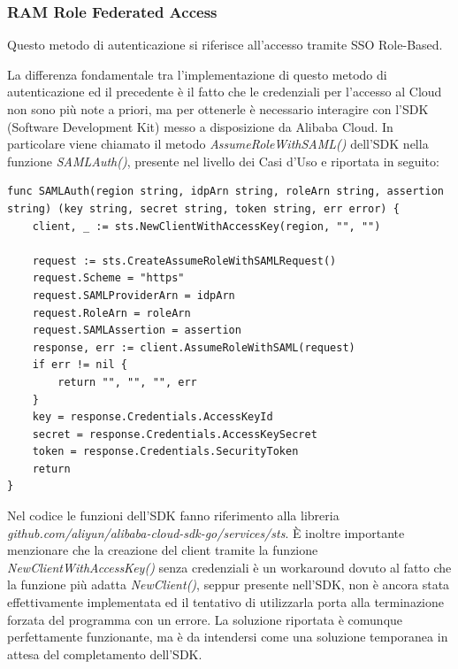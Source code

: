 \documentclass[a4paper]{article}
\begin{document}
\subsubsection{RAM Role Federated Access}
Questo metodo di autenticazione si riferisce all'accesso tramite SSO Role-Based.

La differenza fondamentale tra l'implementazione di questo metodo di autenticazione ed il precedente è il fatto che le credenziali per l'accesso al Cloud non sono più note a priori, ma per ottenerle è necessario interagire con l'SDK (Software Development Kit) messo a disposizione da Alibaba Cloud. In particolare viene chiamato il metodo \textit{AssumeRoleWithSAML()} dell'SDK nella funzione \textit{SAMLAuth()}, presente nel livello dei Casi d'Uso e riportata in seguito:

\begin{lstlisting}[style=customgo, caption=alibaba\_ram\_role\_federated\_session\_actions.go (righe 20-36), captionpos=b, firstnumber=20]
func SAMLAuth(region string, idpArn string, roleArn string, assertion string) (key string, secret string, token string, err error) {
	client, _ := sts.NewClientWithAccessKey(region, "", "")

	request := sts.CreateAssumeRoleWithSAMLRequest()
	request.Scheme = "https"
	request.SAMLProviderArn = idpArn
	request.RoleArn = roleArn
	request.SAMLAssertion = assertion
	response, err := client.AssumeRoleWithSAML(request)
	if err != nil {
		return "", "", "", err
	}
	key = response.Credentials.AccessKeyId
	secret = response.Credentials.AccessKeySecret
	token = response.Credentials.SecurityToken
	return
}
\end{lstlisting}
Nel codice le funzioni dell'SDK fanno riferimento alla libreria \textit{github.com/aliyun/alibaba-cloud-sdk-go/services/sts}. È inoltre importante menzionare che la creazione del client tramite la funzione \textit{NewClientWithAccessKey()} senza credenziali è un workaround dovuto al fatto che la funzione più adatta \textit{NewClient()}, seppur presente nell'SDK, non è ancora stata effettivamente implementata ed il tentativo di utilizzarla porta alla terminazione forzata del programma con un errore. La soluzione riportata è comunque perfettamente funzionante, ma è da intendersi come una soluzione temporanea in attesa del completamento dell'SDK.\\
\end{document}
